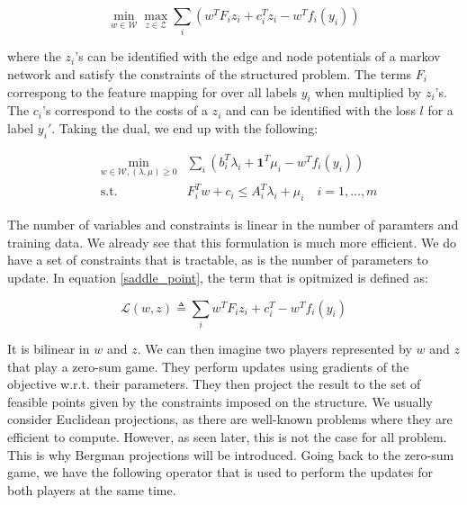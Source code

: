 \documentclass{article}
\begin{document}
\begin{equation}
  \min_{w \in \mathcal{W}} \max_{z \in \mathcal{Z}} \sum_i \left( w^T F_i z_i + c_i^T z_i - w^T f_i(y_i) \right)
  \label{saddle_point}
\end{equation}

where the $z_i$'s can be identified with the edge and node potentials of a markov network and satisfy the constraints of the structured problem. The terms $F_i$ correspong to the feature mapping for over all labels $y_i$ when multiplied by $z_i$'s. The $c_i$'s correspond to the costs of a $z_i$ and can be identified with the loss $l$ for a label $y_i'$. Taking the dual, we end up with the following:

\begin{equation}
  \begin{aligned}
    &\min_{w \in \mathcal{W}, (\lambda,\mu) \geq 0} &\sum_i \left( b_i^T \lambda_i + \mathbf{1}^T \mu_i - w^T f_i(y_i) \right)\\
    &\text{s.t.} &F_i^T w + c_i \leq A_i^T \lambda_i + \mu_i \quad i=1,\dots,m
  \end{aligned}
\end{equation}

The number of variables and constraints is linear in the number of paramters and training data. We already see that this formulation is much more efficient. We do have a set of constraints that is tractable, as is the number of parameters to update. In equation \ref{saddle_point}, the term that is opitmized is defined as:

\begin{equation}
  \mathcal{L}(w,z) \triangleq \sum_i w^T F_i z_i + c_i^T - w^T f_i(y_i)
  \label{saddle_obj}
\end{equation}

It is bilinear in $w$ and $z$. We can then imagine two players represented by $w$ and $z$ that play a zero-sum game. They perform updates using gradients of the objective w.r.t. their parameters. They then project the result to the set of feasible points given by the constraints imposed on the structure. We usually consider Euclidean projections, as there are well-known problems where they are efficient to compute. However, as seen later, this is not the case for all problem. This is why Bergman projections will be introduced. Going back to the zero-sum game, we have the following operator that is used to perform the updates for both players at the same time. 
\end{document}
